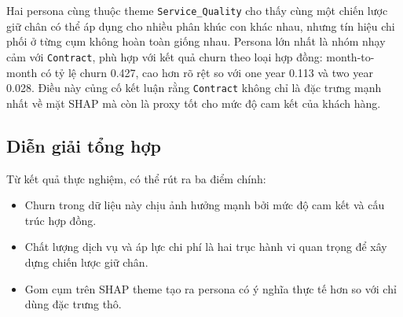 ﻿\documentclass[conference]{IEEEtran}
\begin{document}
\begin{table}[t]
\centering
\caption{Tóm tắt persona và hành động giữ chân}
\label{tab:persona_vn}
\end{table}

Hai persona cùng thuộc theme \texttt{Service\_Quality} cho thấy cùng một chiến lược giữ chân có thể áp dụng cho nhiều phân khúc con khác nhau, nhưng tín hiệu chi phối ở từng cụm không hoàn toàn giống nhau. Persona lớn nhất là nhóm nhạy cảm với \texttt{Contract}, phù hợp với kết quả churn theo loại hợp đồng: month-to-month có tỷ lệ churn 0.427, cao hơn rõ rệt so với one year 0.113 và two year 0.028. Điều này củng cố kết luận rằng \texttt{Contract} không chỉ là đặc trưng mạnh nhất về mặt SHAP mà còn là proxy tốt cho mức độ cam kết của khách hàng.

\subsection{Diễn giải tổng hợp}
Từ kết quả thực nghiệm, có thể rút ra ba điểm chính:
\begin{itemize}[leftmargin=*]
    \item Churn trong dữ liệu này chịu ảnh hưởng mạnh bởi mức độ cam kết và cấu trúc hợp đồng.
    \item Chất lượng dịch vụ và áp lực chi phí là hai trục hành vi quan trọng để xây dựng chiến lược giữ chân.
    \item Gom cụm trên SHAP theme tạo ra persona có ý nghĩa thực tế hơn so với chỉ dùng đặc trưng thô.
\end{itemize}
\end{document}
